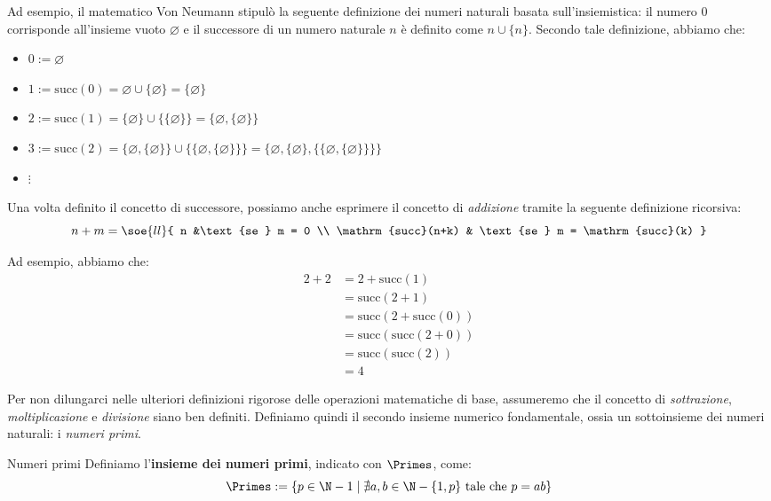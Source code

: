 \documentclass[a4paper, 12pt]{report}
\begin{document}
    Ad esempio, il matematico Von Neumann stipulò la seguente definizione dei numeri naturali basata sull'insiemistica: il numero 0 corrisponde all'insieme vuoto $\varnothing$ e il successore di un numero naturale $n$ è definito come $n \cup \{n\}$. Secondo tale definizione, abbiamo che:
    \begin{itemize}
        \item $0 := \varnothing$
        \item $1 := \mathrm{succ}(0) = \varnothing \cup \{\varnothing\} = \{\varnothing\}$
        \item $2 := \mathrm{succ}(1) =  \{\varnothing\} \cup \{ \{\varnothing\}\} = \{\varnothing,  \{\varnothing\}\}$
        \item $3 := \mathrm{succ}(2) =  \{\varnothing,  \{\varnothing\}\} \cup \{\{\varnothing,  \{\varnothing\}\}\} = \{\varnothing,  \{\varnothing\}, \{\{\varnothing,  \{\varnothing\}\}\}\}$
        \item $\vdots$
    \end{itemize}

    Una volta definito il concetto di successore, possiamo anche esprimere il concetto di \textit{addizione} tramite la seguente definizione ricorsiva:
    \[n + m = \soe{ll}{
        n &\text{se } m = 0 \\
        \mathrm{succ}(n+k) & \text{se } m = \mathrm{succ}(k)
    }\]

    Ad esempio, abbiamo che:
    \[\begin{split}
        2 + 2 &= 2 + \mathrm{succ}(1) \\
        &= \mathrm{succ}(2+1) \\
        &= \mathrm{succ}(2+\mathrm{succ}(0)) \\
        &= \mathrm{succ}(\mathrm{succ}(2+0)) \\
        &= \mathrm{succ}(\mathrm{succ}(2)) \\
        &= 4
    \end{split}\]

    Per non dilungarci nelle ulteriori definizioni rigorose delle operazioni matematiche di base, assumeremo che il concetto di \textit{sottrazione}, \textit{moltiplicazione} e \textit{divisione} siano ben definiti. Definiamo quindi il secondo insieme numerico fondamentale, ossia un sottoinsieme dei numeri naturali: i \textit{numeri primi}.
    
    \begin{frameddefn}{Numeri primi}
        Definiamo l'\textbf{insieme dei numeri primi}, indicato con $\Primes$, come:
        \[\Primes := \{p \in \N -{1} \mid \nexists a,b \in \N-\{1,p\} \text{ tale che } p = ab\}\]
    \end{frameddefn}
\end{document}
